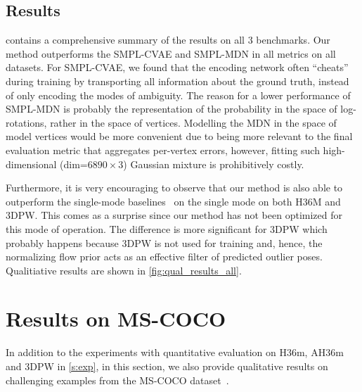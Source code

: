 \subsection{Results}\label{s:exp_results}
 contains a comprehensive summary of the results on all 3 benchmarks. Our method outperforms the SMPL-CVAE and SMPL-MDN in all metrics on all datasets. 
For SMPL-CVAE, we found that the encoding network often ``cheats'' during training by transporting all information about the ground truth, instead of only encoding the modes of ambiguity.
The reason for a lower performance of SMPL-MDN is probably the representation of the probability in the space of log-rotations, rather in the space of vertices.
Modelling the MDN in the space of model vertices would be more convenient due to being more relevant to the final evaluation metric that aggregates per-vertex errors, however, fitting such high-dimensional (dim=$6890 \times 3$) Gaussian mixture is prohibitively costly. 

Furthermore, it is very encouraging to observe that our method is also able to outperform the single-mode baselines~\cite{kanazawa18end-to-end,kolotouros19convolutional,kolotouros19learning} on the single mode \MPJPE on both H36M and 3DPW. 
This comes as a surprise since our method has not been optimized for this mode of operation.
The difference is more significant for 3DPW which probably happens because 3DPW is not used for training and, hence, the normalizing flow prior acts as an effective filter of predicted outlier poses. Qualitiative results are shown in \cref{fig:qual_results_all}.




\section{Results on MS-COCO} \label{s:supp_qual}
In addition to the experiments with quantitative evaluation on H36m, AH36m and 3DPW in \cref{s:exp}, in this section, we also provide qualitative results on challenging examples from the MS-COCO dataset~\cite{lin2014microsoft}.



